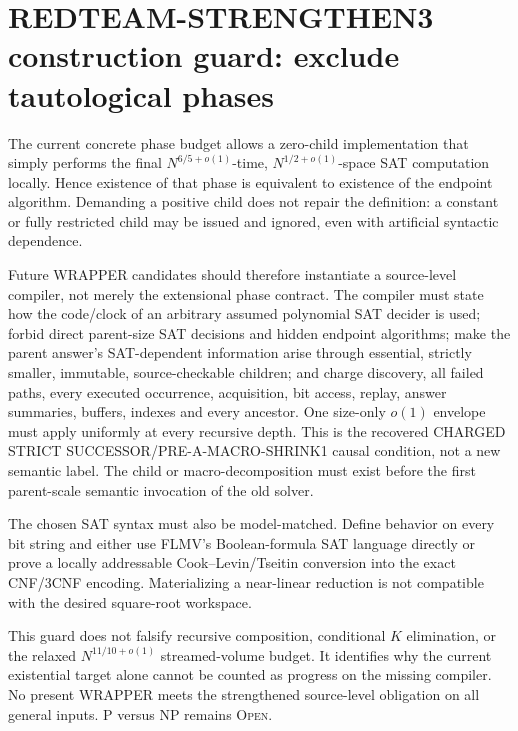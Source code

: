 \section*{REDTEAM-STRENGTHEN3 construction guard: exclude tautological phases}

The current concrete phase budget allows a zero-child implementation that
simply performs the final $N^{6/5+o(1)}$-time,
$N^{1/2+o(1)}$-space SAT computation locally.  Hence existence of that phase
is equivalent to existence of the endpoint algorithm.  Demanding a positive
child does not repair the definition: a constant or fully restricted child
may be issued and ignored, even with artificial syntactic dependence.

Future WRAPPER candidates should therefore instantiate a source-level
compiler, not merely the extensional phase contract.  The compiler must state
how the code/clock of an arbitrary assumed polynomial SAT decider is used;
forbid direct parent-size SAT decisions and hidden endpoint algorithms;
make the parent answer's SAT-dependent information arise through essential,
strictly smaller, immutable, source-checkable children; and charge discovery,
all failed paths, every executed occurrence, acquisition, bit access, replay,
answer summaries, buffers, indexes and every ancestor.  One size-only
$o(1)$ envelope must apply uniformly at every recursive depth.
This is the recovered CHARGED STRICT SUCCESSOR/PRE-A-MACRO-SHRINK1 causal
condition, not a new semantic label.  The child or macro-decomposition must
exist before the first parent-scale semantic invocation of the old solver.

The chosen SAT syntax must also be model-matched.  Define behavior on every
bit string and either use FLMV's Boolean-formula SAT language directly or
prove a locally addressable Cook--Levin/Tseitin conversion into the exact
CNF/3CNF encoding.  Materializing a near-linear reduction is not compatible
with the desired square-root workspace.

This guard does not falsify recursive composition, conditional $K$
elimination, or the relaxed $N^{11/10+o(1)}$ streamed-volume budget.  It
identifies why the current existential target alone cannot be counted as
progress on the missing compiler.  No present WRAPPER meets the strengthened
source-level obligation on all general inputs.  P versus NP remains
\textsc{Open}.

